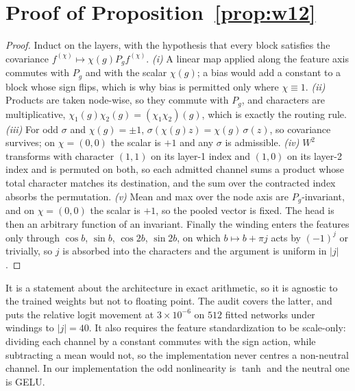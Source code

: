 
\section{Proof of Proposition~\ref{prop:w12}}\label{app:w12}

\begin{proof}
Induct on the layers, with the hypothesis that every block satisfies the covariance
$f^{(\chi)} \mapsto \chi(g) P_g f^{(\chi)}$. \emph{(i)} A linear map applied along the feature
axis commutes with $P_g$ and with the scalar $\chi(g)$; a bias would add a constant to a block whose
sign flips, which is why bias is permitted only where $\chi \equiv 1$. \emph{(ii)} Products are
taken node-wise, so they commute with $P_g$, and characters are multiplicative,
$\chi_1(g)\chi_2(g) = (\chi_1\chi_2)(g)$, which is exactly the routing rule. \emph{(iii)} For odd
$\sigma$ and $\chi(g) = \pm1$, $\sigma(\chi(g) z) = \chi(g)\,\sigma(z)$, so covariance survives;
on $\chi = (0,0)$ the scalar is $+1$ and any $\sigma$ is admissible. \emph{(iv)} $W^2$ transforms
with character $(1,1)$ on its layer-1 index and $(1,0)$ on its layer-2 index and is permuted on both,
so each admitted channel sums a product whose total character matches its destination, and the sum
over the contracted index absorbs the permutation. \emph{(v)} Mean and max over the node axis are
$P_g$-invariant, and on $\chi = (0,0)$ the scalar is $+1$, so the pooled vector is fixed. The head
is then an arbitrary function of an invariant. Finally the winding enters the features only through
$\cos b$, $\sin b$, $\cos 2b$, $\sin 2b$, on which $b \mapsto b + \pi j$ acts by $(-1)^j$ or
trivially, so $j$ is absorbed into the characters and the argument is uniform in $|j|$.
\end{proof}

It is a statement about the architecture in exact arithmetic, so it is agnostic to the trained
weights but not to floating point. The audit covers the latter, and puts the relative logit movement
at $3\times10^{-6}$ on $512$ fitted networks under windings to $|j| = 40$. It also requires the
feature standardization to be scale-only: dividing each channel by a constant commutes with the sign
action, while subtracting a mean would not, so the implementation never centres a non-neutral
channel. In our implementation the odd nonlinearity is $\tanh$ and the neutral one is GELU.

